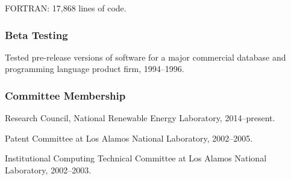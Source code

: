 \documentclass[]{article}
\begin{document}
FORTRAN: 17,868 lines of code.

\subsubsection{Beta Testing}\label{beta-testing}

Tested pre-release versions of software for a major commercial database
and programming language product firm, 1994--1996.

\subsubsection{Committee Membership}\label{committee-membership}

Research Council, National Renewable Energy Laboratory, 2014--present.

Patent Committee at Los Alamos National Laboratory, 2002--2005.

Institutional Computing Technical Committee at Los Alamos National
Laboratory, 2002--2003.
\end{document}
